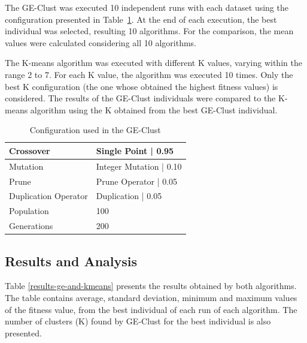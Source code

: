 \documentclass[conference]{IEEEtran}
\begin{document}
	
	The GE-Clust was executed 10 independent runs with each dataset using the configuration presented in Table~\ref{ge-configuration}. At the end of each execution, the best individual was selected, resulting 10 algorithms. For the comparison, the mean values were calculated considering all 10 algorithms.
	
	
	The K-means algorithm was executed with different K values, varying within the range 2 to 7. For each K value, the algorithm was executed 10 times. Only the best K configuration (the one whose obtained the highest fitness values) is considered. The results of the GE-Clust individuals were compared to the K-means algorithm using the K obtained from the best GE-Clust individual.
	
	
	\begin{table}[]
		\centering
		\caption{Configuration used in the GE-Clust}
		\label{ge-configuration}
		\begin{tabular}{|l|l|}
			\hline
			{Crossover }           & Single Point  | 0.95     \\ \hline
			{Mutation }            & Integer Mutation   |  0.10 \\ \hline
			{Prune  }              & Prune Operator | 0.05   \\ \hline
			{Duplication Operator } & Duplication   | 0.05     \\ \hline
			{Population}                        & 100                               \\ \hline
			{Generations}                       & 200                               \\ \hline
		\end{tabular}
	\end{table}

	
	\subsection{Results and Analysis}
	
	
	Table \ref{results-ge-and-kmeans} presents the results obtained by both algorithms. The table contains average, standard deviation, minimum and maximum values of the fitness value, from the best individual of each run of each algorithm. The number of clusters (K) found by GE-Clust for the best individual is also presented.
	
\end{document}

